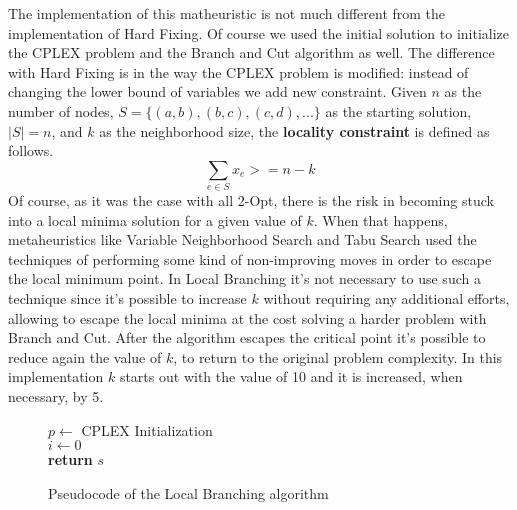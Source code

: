 The implementation of this matheuristic is not much different from the implementation of Hard Fixing.
Of course we used the initial solution to initialize the CPLEX problem and the Branch and Cut algorithm as well.
The difference with Hard Fixing is in the way the CPLEX problem is modified: instead of changing the lower bound of variables we add new constraint.
Given $n$ as the number of nodes, $S = \{(a,b),(b,c),(c,d),...\}$ as the starting solution, $|S| = n$, and $k$ as the neighborhood size, the \textbf{locality constraint} is defined as follows.
\[
    \sum_{e \in S} x_e >= n-k
\]
Of course, as it was the case with all 2-Opt, there is the risk in becoming stuck into a local minima solution for a given value of $k$.
When that happens, metaheuristics like Variable Neighborhood Search and Tabu Search used the techniques of performing some kind of non-improving moves in order to escape the local minimum point.
In Local Branching it's not necessary to use such a technique since it's possible to increase $k$ without requiring any additional efforts, allowing to escape the local minima at the cost solving a harder problem with Branch and Cut.
After the algorithm escapes the critical point it's possible to reduce again the value of $k$, to return to the original problem complexity.
In this implementation $k$ starts out with the value of 10 and it is increased, when necessary, by 5.

\begin{figure}[htbp]
	\begin{algorithm}[H]
		\vspace{2mm}
        $p \gets$ CPLEX Initialization \\
        $i \gets 0$ \\ 
        \textbf{return} $s$
	\end{algorithm}
	\caption{Pseudocode of the Local Branching algorithm} \label{fig:localBranching}
\end{figure}

